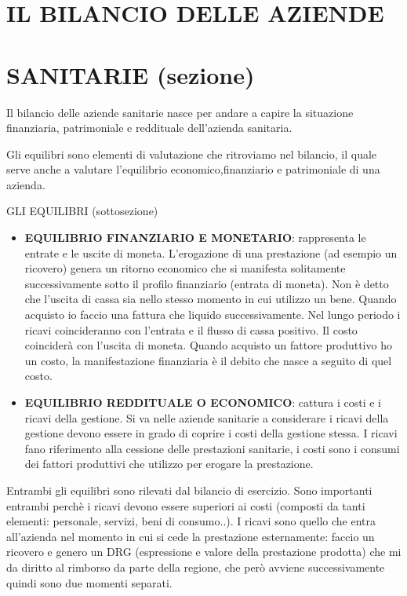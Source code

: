 \documentclass[]{article}
\date{}
\begin{document}
\section{IL BILANCIO DELLE AZIENDE }\label{il-bilancio-delle-aziende}

\section{SANITARIE (sezione) }\label{sanitarie-sezione}

Il bilancio delle aziende sanitarie nasce per andare a capire la
situazione finanziaria, patrimoniale e reddituale dell'azienda
sanitaria.

Gli equilibri sono elementi di valutazione che ritroviamo nel bilancio,
il quale serve anche a valutare l'equilibrio economico,finanziario e
patrimoniale di una azienda.

GLI EQUILIBRI (sottosezione)

\begin{itemize}
\item
  \textbf{EQUILIBRIO FINANZIARIO E MONETARIO}: rappresenta le entrate e
  le uscite di moneta. L'erogazione di una prestazione (ad esempio un
  ricovero) genera un ritorno economico che si manifesta solitamente
  successivamente sotto il profilo finanziario (entrata di moneta). Non
  è detto che l'uscita di cassa sia nello stesso momento in cui utilizzo
  un bene. Quando acquisto io faccio una fattura che liquido
  successivamente. Nel lungo periodo i ricavi coincideranno con
  l'entrata e il flusso di cassa positivo. Il costo coinciderà con
  l'uscita di moneta. Quando acquisto un fattore produttivo ho un costo,
  la manifestazione finanziaria è il debito che nasce a seguito di quel
  costo.
\item
  \textbf{EQUILIBRIO REDDITUALE O ECONOMICO}: cattura i costi e i ricavi
  della gestione. Si va nelle aziende sanitarie a considerare i ricavi
  della gestione devono essere in grado di coprire i costi della
  gestione stessa. I ricavi fano riferimento alla cessione delle
  prestazioni sanitarie, i costi sono i consumi dei fattori produttivi
  che utilizzo per erogare la prestazione.
\end{itemize}

Entrambi gli equilibri sono rilevati dal bilancio di esercizio. Sono
importanti entrambi perchè i ricavi devono essere superiori ai costi
(composti da tanti elementi: personale, servizi, beni di consumo..). I
ricavi sono quello che entra all'azienda nel momento in cui si cede la
prestazione esternamente: faccio un ricovero e genero un DRG
(espressione e valore della prestazione prodotta) che mi da diritto al
rimborso da parte della regione, che però avviene successivamente quindi
sono due momenti separati.
\end{document}
